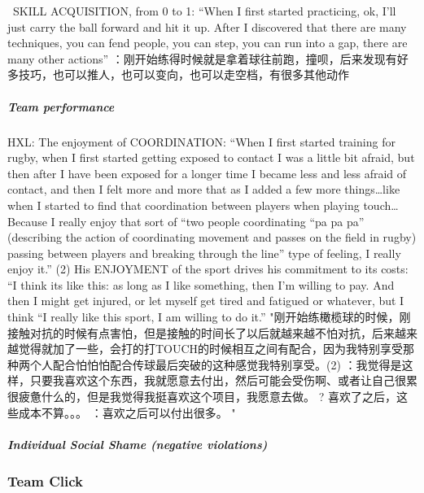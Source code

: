 \begin{CJK}{UTF8}{gbsn}
                 SKILL ACQUISITION, from 0 to 1: “When I first started practicing, ok, I’ll just carry the ball forward and hit it up. After I discovered that there are many techniques, you can fend people, you can step, you can run into a gap, there are many other actions”	：刚开始练得时候就是拿着球往前跑，撞呗，后来发现有好多技巧，也可以推人，也可以变向，也可以走空档，有很多其他动作 
          \subparagraph{Team performance}

          HXL:
          The enjoyment of COORDINATION: “When I first started training for rugby, when I first started getting exposed to contact I was a little bit afraid, but then after I have been exposed for a longer time I became less and less afraid of contact, and then I felt more and more that as I added a few more things…like when I started to find that coordination between players when playing touch…Because I really enjoy that sort of “two people coordinating “pa pa pa” (describing the action of coordinating movement and passes on the field in rugby) passing between players and breaking through the line” type of feeling, I really enjoy it.” (2) His ENJOYMENT of the sport drives his commitment to its costs: “I think its like this: as long as I like something, then I’m willing to pay.  And then I might get injured, or let myself get tired and fatigued or whatever, but I think “I really like this sport, I am willing to do it.” 	"刚开始练橄榄球的时候，刚接触对抗的时候有点害怕，但是接触的时间长了以后就越来越不怕对抗，后来越来越觉得就加了一些，会打的打TOUCH的时候相互之间有配合，因为我特别享受那种两个人配合怕怕怕配合传球最后突破的这种感觉我特别享受。(2) ：我觉得是这样，只要我喜欢这个东西，我就愿意去付出，然后可能会受伤啊、或者让自己很累很疲惫什么的，但是我觉得我挺喜欢这个项目，我愿意去做。
          ? 喜欢了之后，这些成本不算。。。
          ：喜欢之后可以付出很多。
          "
          \subparagraph{Individual Social Shame (negative violations)}


















        \subsubsection{Team Click}



\end{CJK}
